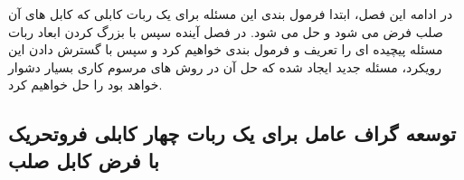 در ادامه این فصل، ابتدا فرمول بندی این مسئله برای یک ربات کابلی که کابل های آن صلب فرض می شود و حل می شود. در فصل آینده سپس با بزرگ کردن ابعاد ربات مسئله پیچیده ای را تعریف و فرمول بندی خواهیم کرد و سپس با گسترش دادن این رویکرد، مسئله جدید ایجاد شده که حل آن در روش های مرسوم کاری بسیار دشوار خواهد بود را حل خواهیم کرد. 
 

\subsection{توسعه گراف عامل برای یک ربات چهار کابلی فروتحریک با فرض کابل صلب}
 
 
 
 
 
 
 
 
 
 
 
 
 